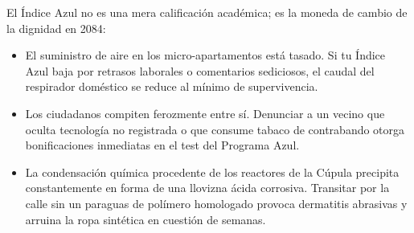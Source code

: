 El Índice Azul no es una mera calificación académica; es la moneda de cambio de la dignidad en 2084:

\begin{itemize}
  \item {} El suministro de aire en los micro-apartamentos está tasado. Si tu Índice Azul baja por retrasos laborales o comentarios sediciosos, el caudal del respirador doméstico se reduce al mínimo de supervivencia.
  \item {} Los ciudadanos compiten ferozmente entre sí. Denunciar a un vecino que oculta tecnología no registrada o que consume tabaco de contrabando otorga bonificaciones inmediatas en el test del Programa Azul.
  \item {} La condensación química procedente de los reactores de la Cúpula precipita constantemente en forma de una llovizna ácida corrosiva. Transitar por la calle sin un paraguas de polímero homologado provoca dermatitis abrasivas y arruina la ropa sintética en cuestión de semanas.
\end{itemize}

